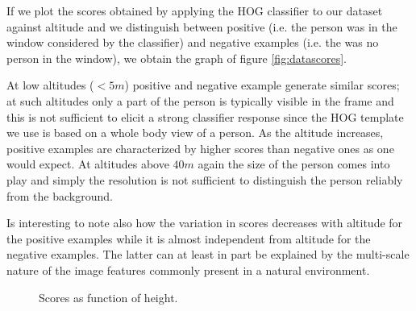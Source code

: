 \documentclass[a4paper,11pt]{report}
\begin{document}
If we plot the scores obtained by applying the HOG classifier to our dataset against altitude and we distinguish between positive (i.e. the person was in the window considered by the classifier) and negative examples (i.e. the was no person in the window), we obtain the graph of figure \ref{fig:datascores}.

At low altitudes ($<5m$) positive and negative example generate similar scores; at such altitudes only a part of the person is typically visible in the frame and this is not sufficient to elicit a strong classifier response since the HOG template we use is based on a whole body view of a person. As the altitude increases, positive examples are characterized by higher scores than negative ones as one would expect. At altitudes above $40m$ again the size of the person comes into play and simply the resolution is not sufficient to distinguish the person reliably from the background.

Is interesting to note also how the variation in scores decreases with altitude for the positive examples while it is almost independent from altitude for the negative examples. The latter can at least in part be explained by the multi-scale nature of the image features commonly present in a natural environment.   

\begin{figure}[ht]
\centering
{}
\quad
{}
\caption{Scores as function of height.\label{fig:dataandmodels}}
\end{figure}
\end{document}
